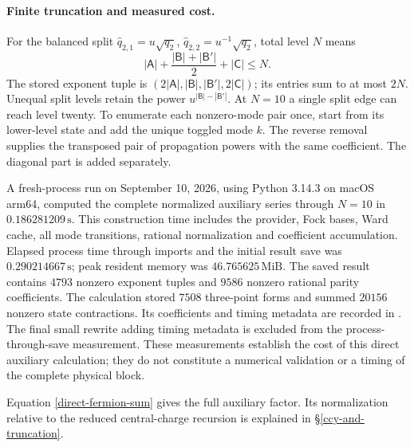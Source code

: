 \paragraph{Finite truncation and measured cost.}
For the balanced split
$\hat q_{2,1}=u\sqrt{q_2}$,
$\hat q_{2,2}=u^{-1}\sqrt{q_2}$, total level $N$ means
\begin{equation}
 |\mathsf A|+
 \frac{|\mathsf B|+|\mathsf B'|}{2}+|\mathsf C|\leq N.
\end{equation}
The stored exponent tuple is
$(2|\mathsf A|,|\mathsf B|,|\mathsf B'|,2|\mathsf C|)$;
its entries sum to at most $2N$.  Unequal split levels retain the
power $u^{|\mathsf B|-|\mathsf B'|}$.  At $N=10$ a single split
edge can reach level twenty.  To enumerate each nonzero-mode pair
once, start from its lower-level state and add the unique toggled
mode $k$.  The reverse removal supplies the transposed pair of
propagation powers with the same coefficient.  The diagonal part
is added separately.

A fresh-process run on September 10, 2026, using Python 3.14.3 on
macOS arm64, computed the complete normalized auxiliary series through
$N=10$ in $0.186281209\,\mathrm{s}$.  This construction time includes
the provider, Fock bases, Ward cache, all mode transitions, rational
normalization and coefficient accumulation.  Elapsed process time
through imports and the initial result save was
$0.290214667\,\mathrm{s}$; peak resident memory was
$46.765625\,\mathrm{MiB}$.  The saved result contains $4793$
nonzero exponent tuples and $9586$ nonzero rational parity
coefficients.  The calculation stored $7508$ three-point forms and
summed $20156$ nonzero state contractions.  Its coefficients and
timing metadata are recorded in
.
The final small rewrite adding timing metadata is excluded from the
process-through-save measurement.  These measurements establish the
cost of this direct auxiliary calculation; they do not constitute a
numerical validation or a timing of the complete physical block.

Equation \eqref{direct-fermion-sum} gives the full auxiliary factor.
Its normalization relative to the reduced central-charge recursion is
explained in \S\ref{ccy-and-truncation}.

